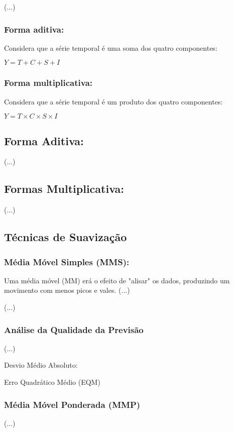        (...)
    
        \subsubsection{Forma aditiva:}
        
            Considera que a série temporal é uma soma dos quatro componentes:
            
            $Y = T + C + S + I$
        
        \subsubsection{Forma multiplicativa:}
        
            Considera que a série temporal é um produto dos quatro componentes:
            
            $Y = T \times C \times S \times I$
            
    \subsection{Forma Aditiva:}
    
        (...)
        
    \subsection{Formas Multiplicativa:}
    
        (...)
        
    \subsection{Técnicas de Suavização}
    
        \subsubsection{Média Móvel Simples (MMS):}
        
            Uma média móvel (MM) erá o efeito de "alisar" os dados, produzindo um movimento com menos picos e vales. (...)
            
            (...)
            
        \subsubsection{Análise da Qualidade da Previsão}
        
            (...)
            
            Desvio Médio Absoluto: 
            
            Erro Quadrático Médio (EQM)
            
        \subsubsection{Média Móvel Ponderada (MMP)}
        
            (...)
            
            